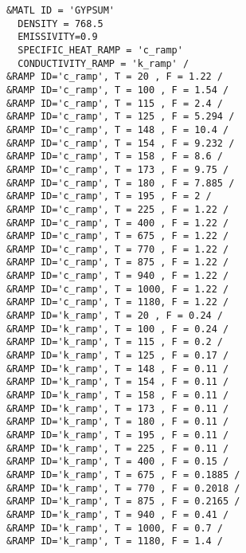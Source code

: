 \begin{lstlisting}
&MATL ID = 'GYPSUM'
  DENSITY = 768.5
  EMISSIVITY=0.9
  SPECIFIC_HEAT_RAMP = 'c_ramp'
  CONDUCTIVITY_RAMP = 'k_ramp' /
&RAMP ID='c_ramp', T = 20 , F = 1.22 /
&RAMP ID='c_ramp', T = 100 , F = 1.54 /
&RAMP ID='c_ramp', T = 115 , F = 2.4 /
&RAMP ID='c_ramp', T = 125 , F = 5.294 /
&RAMP ID='c_ramp', T = 148 , F = 10.4 /
&RAMP ID='c_ramp', T = 154 , F = 9.232 /
&RAMP ID='c_ramp', T = 158 , F = 8.6 /
&RAMP ID='c_ramp', T = 173 , F = 9.75 /
&RAMP ID='c_ramp', T = 180 , F = 7.885 /
&RAMP ID='c_ramp', T = 195 , F = 2 /
&RAMP ID='c_ramp', T = 225 , F = 1.22 /
&RAMP ID='c_ramp', T = 400 , F = 1.22 /
&RAMP ID='c_ramp', T = 675 , F = 1.22 /
&RAMP ID='c_ramp', T = 770 , F = 1.22 /
&RAMP ID='c_ramp', T = 875 , F = 1.22 /
&RAMP ID='c_ramp', T = 940 , F = 1.22 /
&RAMP ID='c_ramp', T = 1000, F = 1.22 /
&RAMP ID='c_ramp', T = 1180, F = 1.22 /
&RAMP ID='k_ramp', T = 20 , F = 0.24 /
&RAMP ID='k_ramp', T = 100 , F = 0.24 /
&RAMP ID='k_ramp', T = 115 , F = 0.2 /
&RAMP ID='k_ramp', T = 125 , F = 0.17 /
&RAMP ID='k_ramp', T = 148 , F = 0.11 /
&RAMP ID='k_ramp', T = 154 , F = 0.11 /
&RAMP ID='k_ramp', T = 158 , F = 0.11 /
&RAMP ID='k_ramp', T = 173 , F = 0.11 /
&RAMP ID='k_ramp', T = 180 , F = 0.11 /
&RAMP ID='k_ramp', T = 195 , F = 0.11 /
&RAMP ID='k_ramp', T = 225 , F = 0.11 /
&RAMP ID='k_ramp', T = 400 , F = 0.15 /
&RAMP ID='k_ramp', T = 675 , F = 0.1885 /
&RAMP ID='k_ramp', T = 770 , F = 0.2018 /
&RAMP ID='k_ramp', T = 875 , F = 0.2165 /
&RAMP ID='k_ramp', T = 940 , F = 0.41 /
&RAMP ID='k_ramp', T = 1000, F = 0.7 /
&RAMP ID='k_ramp', T = 1180, F = 1.4 /


\end{lstlisting}
